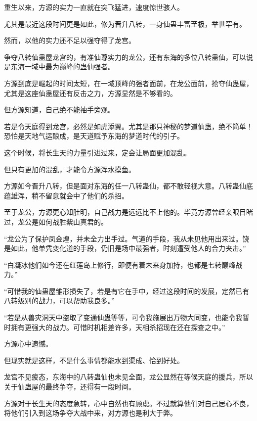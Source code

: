 
\begin{this_body}

重生以来，方源的实力一直就在突飞猛进，速度惊世骇人。

尤其是最近这段时间更是如此，修为晋升八转，一身仙蛊丰富至极，举世罕有。

然而，以他的实力还不足以强夺得了龙宫。

争夺八转仙蛊屋龙宫的，有准仙尊实力的龙公，还有东海的多位八转蛊仙，可以说是东海一域中最为巅峰的蛊仙强者。

方源到底是崛起的时间太短，在一域顶峰的强者面前，在龙公面前，抢夺仙蛊屋，尤其是这座仙蛊屋还有反击之力，方源显然是不够看的。

但方源知道，自己绝不能袖手旁观。

若是令天庭得到龙宫，必然是如虎添翼。尤其是那只神秘的梦道仙蛊，绝不简单！恐怕是天地气运酿成，是天道赋予东海的梦道时代的引子。

这个时候，将长生天的力量引进过来，定会让局面更加混乱。

但只有更加的混乱，才能令方源浑水摸鱼。

方源如今晋升八转，但是面对东海的任一八转蛊仙，都不敢轻视大意。八转蛊仙底蕴雄浑，稍不留意就会中了他们的杀招。

至于龙公，方源更心知肚明，自己战力是远远比不上他的。毕竟方源曾经亲眼目睹过，龙公是如何战胜紫山真君的。

“龙公为了保护凤金煌，并未全力出手过。气道的手段，我从未见他用出来过。饶是如此，他单凭变化道的手段，仍旧是场中最强者，时刻遭受他人的合力夹击。”

“白凝冰他们如今还在红莲岛上修行，即便有着未来身加持，也都是七转巅峰战力。”

“可惜我的仙蛊屋雏形损失了，若是有它在手中，经过这段时间的发展，定然已有八转级别的战力，可以帮助我良多。”

“若是从兽灾洞天中盗取了变通仙蛊等等，可令我施展出万物大同变，也能令我暂时拥有更强大的战力。可惜时机相差许多，天相杀招现在还在探查之中。”

方源心中遗憾。

但现实就是这样，不是什么事情都能水到渠成、恰到好处。

龙宫不见疲态，东海中的八转蛊仙也未见全面，龙公显然在等候天庭的援兵，所以关于仙蛊屋的最终争夺，还得有一段时间。

方源对于长生天的态度急转，心中自然也有顾虑。不过就算他们对自己居心不良，将他们引入到这场争夺大战中来，对方源也是利大于弊。


\end{this_body}

